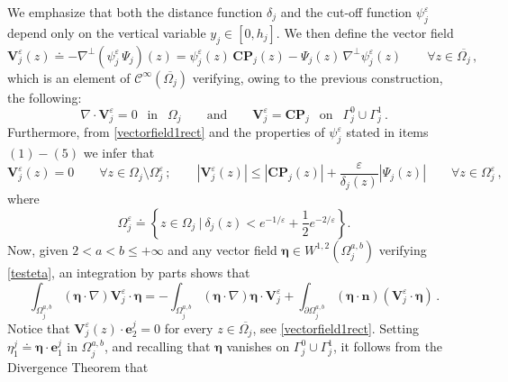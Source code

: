 \documentclass[11pt]{article}
\numberwithin{equation}{section}
\numberwithin{figure}{section}
\def\bbe{{\boldsymbol{\eta}}}
\def\n{{\mathbf n}}
\begin{document}
We emphasize that both the distance function $\delta_{j}$ and the cut-off function $\psi_{j}^{\varepsilon}$ depend only on the vertical
variable $y_{j} \in [0,h_{j}]$. We then define the vector field
\begin{equation} \label{vectorfield1rect}
	\mathbf{V}^{\varepsilon}_{j}(z)  \doteq - \nabla^{\perp} ( \psi_{j}^{\varepsilon} \, \Psi_{j})(z) = \psi_{j}^{\varepsilon}(z) \, \mathbf{CP}_{j}(z) - \Psi_{j}(z) \, \nabla^{\perp} \psi_{j}^{\varepsilon}(z) \qquad \forall z \in \overline{\Omega_{j}} \, ,
\end{equation}
which is an element of $\mathcal{C}^{\infty}(\overline{\Omega_{j}})$ verifying, owing to the previous construction, the following:
\begin{equation}\label{vjeps}
	\nabla \cdot \mathbf{V}^{\varepsilon}_{j} =0 \ \ \mbox{ in } \ \ \Omega_{j} \qquad \text{and} \qquad \mathbf{V}^{\varepsilon}_{j} = \mathbf{CP}_{j} \ \ \mbox{ on } \ \ \Gamma^{0}_{j} \cup \Gamma^{1}_{j} \, .
\end{equation}
Furthermore, from \eqref{vectorfield1rect} and the properties of $\psi_{j}^{\varepsilon}$ stated in items $(1)-(5)$ we infer that
\begin{equation} \label{vort0rect}
	\mathbf{V}^{\varepsilon}_{j}(z) = 0 \qquad \forall z \in \Omega_{j} \setminus \Omega^{\varepsilon}_{j} \, ; \qquad | \mathbf{V}^{\varepsilon}_{j}(z) | \leq |\mathbf{CP}_{j}(z)| + \dfrac{\varepsilon}{\delta_{j}(z)} |\Psi_{j}(z)| \qquad \forall z \in \Omega^{\varepsilon}_{j} \, ,
\end{equation}
where
$$
\Omega^{\varepsilon}_{j} \doteq \left\lbrace z \in \Omega_{j} \ \Big\vert \ \delta_{j}(z) < e^{-1/\varepsilon} + \dfrac{1}{2} e^{-2/\varepsilon} \right\rbrace.
$$
Now, given $2<a<b\le+\infty$ and any vector field $\bbe \in  W^{1,2}(\Omega_j^{a,b})$ verifying \eqref{testeta}, an integration by parts shows that
\begin{equation}\label{HI-2rect}
	\int_{ \Omega_j^{a,b}} (\bbe\cdot \nabla)\mathbf{V}^{\varepsilon}_{j} \cdot \bbe = - \int_{ \Omega_j^{a,b}} (\bbe\cdot \nabla) \bbe \cdot \mathbf{V}^{\varepsilon}_{j} + \int_{\partial \Omega_j^{a,b}} (\bbe\cdot \n) (\mathbf{V}^{\varepsilon}_{j} \cdot \bbe) \, .
\end{equation}
Notice that $\mathbf{V}^{\varepsilon}_{j}(z) \cdot \mathbf{e}^{j}_{2} = 0$ for every $z \in \overline{\Omega_{j}}$, see \eqref{vectorfield1rect}.
Setting $\eta^{j}_{1} \doteq \bbe \cdot \mathbf{e}^{j}_{1}$ in $\Omega_j^{a,b}$, and recalling that $\bbe$ vanishes on
$\Gamma^{0}_{j} \cup \Gamma^{1}_{j}$, it follows from the Divergence Theorem that
\end{document}
